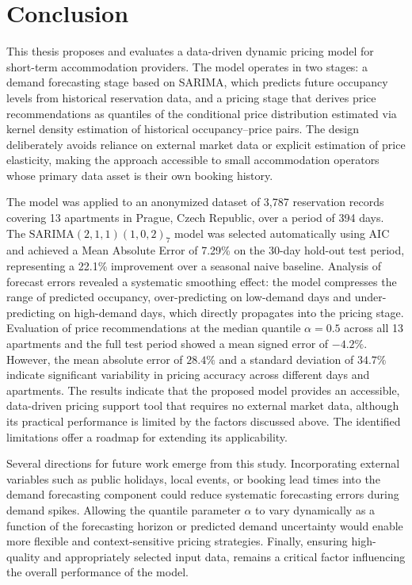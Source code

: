 \chapter*{Conclusion}

This thesis proposes and evaluates a data-driven dynamic pricing model for short-term accommodation providers. The model operates in two stages: a demand forecasting stage based on SARIMA, which predicts future occupancy levels from historical reservation data, and a pricing stage that derives price recommendations as quantiles of the conditional price distribution estimated via kernel density estimation of historical occupancy–price pairs. The design deliberately avoids reliance on external market data or explicit estimation of price elasticity, making the approach accessible to small accommodation operators whose primary data asset is their own booking history.

The model was applied to an anonymized dataset of 3{,}787 reservation records covering 13 apartments in Prague, Czech Republic, over a period of 394 days. The $\mathrm{SARIMA}(2,1,1)(1,0,2)_7$ model was selected automatically using AIC and achieved a Mean Absolute Error of 7.29\% on the 30-day hold-out test period, representing a 22.1\% improvement over a seasonal naive baseline. Analysis of forecast errors revealed a systematic smoothing effect: the model compresses the range of predicted occupancy, over-predicting on low-demand days and under-predicting on high-demand days, which directly propagates into the pricing stage. Evaluation of price recommendations at the median quantile $\alpha=0.5$ across all 13 apartments and the full test period showed a mean signed error of $-4.2\%$. However, the mean absolute error of $28.4\%$ and a standard deviation of $34.7\%$ indicate significant variability in pricing accuracy across different days and apartments. The results indicate that the proposed model provides an accessible, data-driven pricing support tool that requires no external market data, although its practical performance is limited by the factors discussed above. The identified limitations offer a roadmap for extending its applicability.

Several directions for future work emerge from this study. Incorporating external variables such as public holidays, local events, or booking lead times into the demand forecasting component could reduce systematic forecasting errors during demand spikes. Allowing the quantile parameter $\alpha$ to vary dynamically as a function of the forecasting horizon or predicted demand uncertainty would enable more flexible and context-sensitive pricing strategies. Finally, ensuring high-quality and appropriately selected input data, remains a critical factor influencing the overall performance of the model.